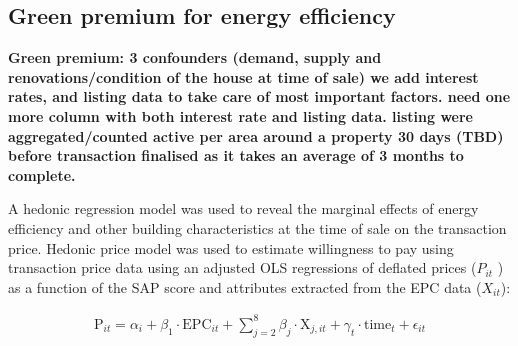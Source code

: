 




\subsection{Green premium for energy efficiency} \label{Sec:green_premium}

\textbf{Green premium: 3 confounders (demand, supply and renovations/condition of the house at time of sale) we add interest rates, and listing data to take care of most important factors. 
need one more column with both interest rate and listing data.
listing were aggregated/counted active per area around a property 30 days (TBD) before transaction finalised as it takes an average of 3 months to complete.}

A  hedonic regression model was used to reveal the marginal effects of energy efficiency and other building characteristics at the time of sale on the transaction price. Hedonic price model was used to estimate willingness to pay using transaction price data \cite{harrison_hedonic_1978} using an adjusted OLS regressions of deflated prices ($P_{it}$ ) as a function of  the SAP score and attributes extracted from the EPC data ($X_{it}$):

\begin{align}
    \text{P}_{it} = \alpha_i + \beta_1 \cdot \text{EPC}_{it} + \sum_{j=2}^{8} \beta_j \cdot             \text{X}_{j,it} +  \gamma_t \cdot \text{time}_t + \epsilon_{it}
\label{Hedonic_m2}
\end{align}

